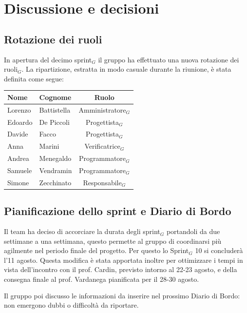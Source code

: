 \documentclass[a4paper, 10pt, colorlinks=true, linkcolor=black, urlcolor=blue, citecolor=blue, hidelinks]{article}
\begin{document}
\section{Discussione e decisioni}

\subsection{Rotazione dei ruoli}
In apertura del decimo sprint$_G$ il gruppo ha effettuato una nuova rotazione dei ruoli$_G$. La ripartizione, estratta in modo casuale durante la riunione, è stata definita come segue:
\begin{center}
    \begin{tabular}{|l|l|c|}
        \hline
        \textbf{Nome} & \textbf{Cognome} & \textbf{Ruolo} \\
        \hline
        Lorenzo & Battistella & Amministratore$_G$ \\
        \hline
        Edoardo & De Piccoli & Progettista$_G$ \\
        \hline
        Davide & Facco & Progettista$_G$ \\
        \hline
        Anna & Marini & Verificatrice$_G$ \\
        \hline
        Andrea & Menegaldo & Programmatore$_G$ \\
        \hline
        Samuele & Vendramin & Programmatore$_G$ \\
        \hline
        Simone & Zecchinato & Responsabile$_G$ \\
        \hline
    \end{tabular}
\end{center}

\subsection{Pianificazione dello sprint e Diario di Bordo}
Il team ha deciso di accorciare la durata degli sprint$_G$ portandoli da due settimane a una settimana, questo permette al gruppo di coordinarsi più agilmente nel periodo finale del progetto. Per questo lo Sprint$_G$ 10 si concluderà l'11 agosto. Questa modifica è stata apportata inoltre per ottimizzare i tempi in vista dell'incontro con il prof. Cardin, previsto intorno al 22-23 agosto, e della consegna finale al prof. Vardanega pianificata per il 28-30 agosto.

Il gruppo poi discusso le informazioni da inserire nel prossimo Diario di Bordo: non emergono dubbi o difficoltà da riportare.
\end{document}
